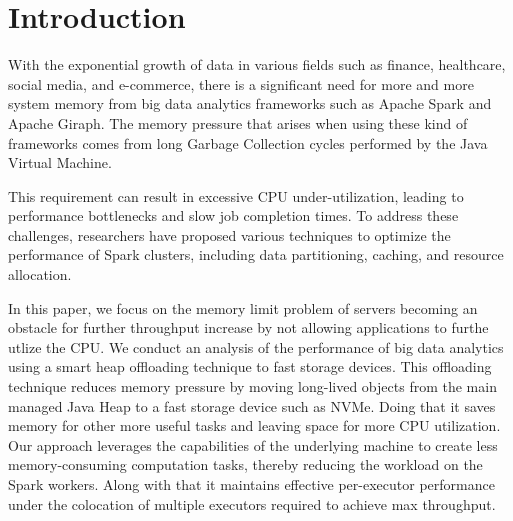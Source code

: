 \section{Introduction}
\label{sec:intro}

With the exponential growth of data in various fields such as finance,
healthcare, social media, and e-commerce, there is a significant need
for more and more system memory from big data analytics frameworks 
such as Apache Spark \cite{Spark} and Apache Giraph. 
The memory pressure that arises when using these kind of frameworks comes from
long Garbage Collection cycles performed by the Java Virtual Machine.

This requirement can result in excessive CPU under-utilization, 
leading to performance bottlenecks and slow job completion
times. To address these challenges, researchers have proposed various
techniques  to optimize the performance of Spark clusters, including
data partitioning, caching, and resource allocation.

In this paper, we focus on the memory limit problem of servers
becoming an obstacle for further throughput increase by not
allowing applications to furthe utlize the CPU. We conduct an
analysis  of the performance of big data analytics using a smart
heap offloading technique to fast storage devices.
This offloading technique reduces memory pressure by
moving long-lived objects from the main managed Java
Heap to a fast storage device such as NVMe. Doing that it saves memory for
other more useful tasks and leaving space for more CPU utilization.
Our approach leverages the capabilities of the underlying machine to
create less memory-consuming computation tasks, thereby reducing the
workload on the Spark workers. Along with that it maintains effective
per-executor performance under the colocation of multiple executors
required to achieve max throughput. 

